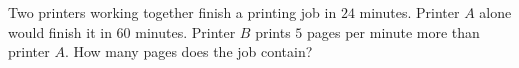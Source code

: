 Two printers working together finish a printing job in $24$ minutes. Printer $A$ alone would finish it in $60$ minutes. Printer $B$ prints $5$ pages per minute more than printer $A$. How many pages does the job contain?
